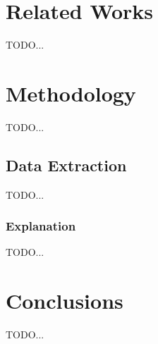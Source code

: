 \documentclass{acm_proc_article-sp}
\begin{document}
\section{Related Works}
TODO...

\section{Methodology}
TODO...

\subsection{Data Extraction}
TODO...

\subsubsection{Explanation}
TODO...

\section{Conclusions}
TODO...




\balancecolumns
\end{document}
